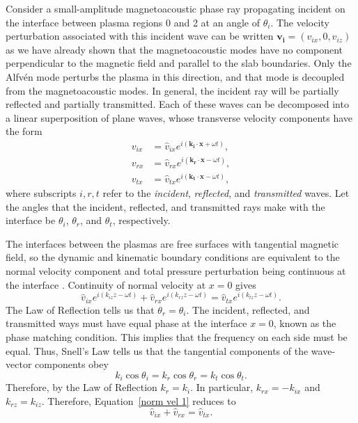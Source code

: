 	Consider a small-amplitude magnetoacoustic phase ray propagating incident on the interface between plasma regions 0 and 2 at an angle of $\theta_i$. The velocity perturbation associated with this incident wave can be written $\mathbf{v_i} = (v_{ix}, 0, v_{iz})$ as we have already shown that the magnetoacoustic modes have no component perpendicular to the magnetic field and parallel to the slab boundaries. Only the Alfv\'{e}n mode perturbs the plasma in this direction, and that mode is decoupled from the magnetoacoustic modes. In general, the incident ray will be partially reflected and partially transmitted. Each of these waves can be decomposed into a linear superposition of plane waves, whose transverse velocity components have the form
	\begin{align}
	v_{ix} &= \hat{v}_{ix} e^{i(\mathbf{k_i}\cdot \mathbf{x} + \omega t)}, \\
	v_{rx} &= \hat{v}_{rx} e^{i(\mathbf{k_r}\cdot \mathbf{x} - \omega t)}, \\
	v_{tx} &= \hat{v}_{tx} e^{i(\mathbf{k_t}\cdot \mathbf{x} - \omega t)},
	\label{fourier}
	\end{align}
	where subscripts $i, r, t$ refer to the \textit{incident}, \textit{reflected}, and \textit{transmitted} waves. Let the angles that the incident, reflected, and transmitted rays make with the interface be $\theta_i$, $\theta_r$, and $\theta_t$, respectively.
	
	The interfaces between the plasmas are free surfaces with tangential magnetic field, so the dynamic and kinematic boundary conditions are equivalent to the normal velocity component and total pressure perturbation being continuous at the interface \citep{goe_etal04}. Continuity of normal velocity at $x = 0$ gives
	\begin{equation}
	\hat{v}_{ix}e^{i(k_{iz}z - \omega t)} + \hat{v}_{rx}e^{i(k_{rz}z - \omega t)} = \hat{v}_{tx}e^{i(k_{tz}z - \omega t)}. \label{norm vel 1}
	\end{equation}
	The Law of Reflection tells us that $\theta_r = \theta_i$. The incident, reflected, and transmitted ways must have equal phase at the interface $x = 0$, known as the phase matching condition. This implies that the frequency on each side must be equal. Thus, Snell's Law tells us that the tangential components of the wave-vector components obey
	\begin{equation}
	k_i\cos{\theta_i} = k_r\cos{\theta_r} = k_t\cos{\theta_t}. \label{tang comp}
	\end{equation}
	Therefore, by the Law of Reflection $k_r = k_i$. In particular, $k_{rx} = -k_{ix}$ and $k_{rz} = k_{iz}$. Therefore, Equation~\eqref{norm vel 1} reduces to
	\begin{equation}
	\hat{v}_{ix} + \hat{v}_{rx} = \hat{v}_{tx}. \label{cont vel}
	\end{equation}
	
